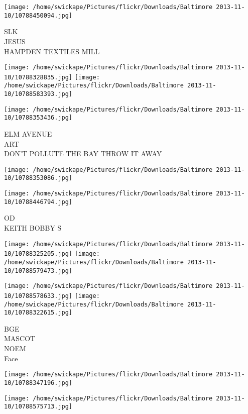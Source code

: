 \documentclass[10pt,letterpaper]{article}
\begin{document}
\vspace{0.25in}
\texttt{[image: /home/swickape/Pictures/flickr/Downloads/Baltimore 2013-11-10/10788450094.jpg]}

SLK\\
JESUS\\
HAMPDEN TEXTILES MILL
\pagebreak

\texttt{[image: /home/swickape/Pictures/flickr/Downloads/Baltimore 2013-11-10/10788328835.jpg]}
\texttt{[image: /home/swickape/Pictures/flickr/Downloads/Baltimore 2013-11-10/10788583393.jpg]}

\vspace{0.25in}
\texttt{[image: /home/swickape/Pictures/flickr/Downloads/Baltimore 2013-11-10/10788353436.jpg]}

ELM AVENUE\\
ART\\
DON'T POLLUTE THE BAY THROW IT AWAY
\pagebreak

\texttt{[image: /home/swickape/Pictures/flickr/Downloads/Baltimore 2013-11-10/10788353086.jpg]}

\vspace{0.25in}
\texttt{[image: /home/swickape/Pictures/flickr/Downloads/Baltimore 2013-11-10/10788446794.jpg]}

OD\\
KEITH BOBBY S
\pagebreak

\texttt{[image: /home/swickape/Pictures/flickr/Downloads/Baltimore 2013-11-10/10788325205.jpg]}
\texttt{[image: /home/swickape/Pictures/flickr/Downloads/Baltimore 2013-11-10/10788579473.jpg]}

\texttt{[image: /home/swickape/Pictures/flickr/Downloads/Baltimore 2013-11-10/10788578633.jpg]}
\texttt{[image: /home/swickape/Pictures/flickr/Downloads/Baltimore 2013-11-10/10788322615.jpg]}

BGE\\
MASCOT\\
NOEM\\
Face
\pagebreak

\texttt{[image: /home/swickape/Pictures/flickr/Downloads/Baltimore 2013-11-10/10788347196.jpg]}

\vspace{0.25in}
\texttt{[image: /home/swickape/Pictures/flickr/Downloads/Baltimore 2013-11-10/10788575713.jpg]}
\end{document}
